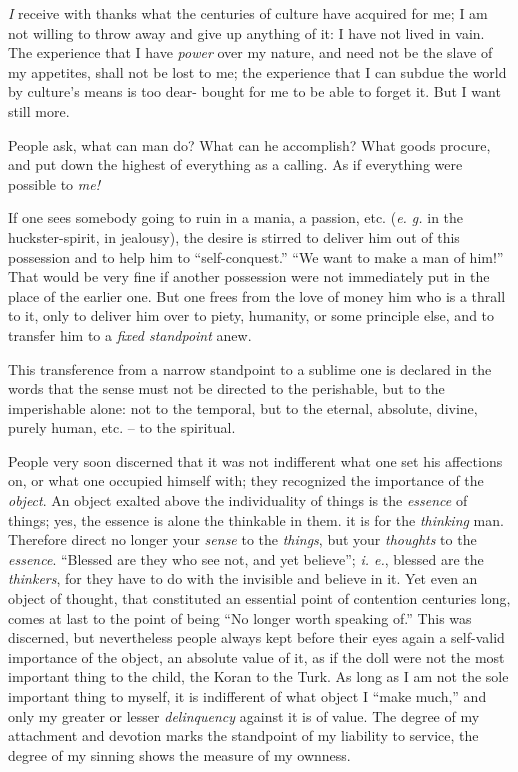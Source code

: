 \documentclass[12pt,a4paper]{book}
\begin{document}
\textit{I} receive with thanks what the centuries of culture have acquired for 
me; I am not willing to throw away and give up anything of it: I have not 
lived in vain. The experience that I have \textit{power} over my nature, and 
need not be the slave of my appetites, shall not be lost to me; the experience 
that I can subdue the world by culture's means is too dear- bought for me to 
be able to forget it. But I want still more.

People ask, what can man do? What can he accomplish? What goods procure, and 
put down the highest of everything as a calling. As if everything were 
possible to \textit{me!}

If one sees somebody going to ruin in a mania, a passion, etc. (\textit{e. g.} 
in the huckster-spirit, in jealousy), the desire is stirred to deliver him out 
of this possession and to help him to ``self-conquest.'' ``We want to make 
a man of him!'' That would be very fine if another possession were not 
immediately put in the place of the earlier one. But one frees from the love 
of money him who is a thrall to it, only to deliver him over to piety, 
humanity, or some principle else, and to transfer him to a \textit{fixed 
standpoint} anew.

This transference from a narrow standpoint to a sublime one is declared in the 
words that the sense must not be directed to the perishable, but to the 
imperishable alone: not to the temporal, but to the eternal, absolute, divine, 
purely human, etc. -- to the spiritual.

People very soon discerned that it was not indifferent what one set his 
affections on, or what one occupied himself with; they recognized the 
importance of the \textit{object}. An object exalted above the individuality 
of things is the \textit{essence} of things; yes, the essence is alone the 
thinkable in them. it is for the \textit{thinking} man. Therefore direct no 
longer your \textit{sense} to the \textit{things}, but your \textit{thoughts} 
to the \textit{essence}. ``Blessed are they who see not, and yet believe''; 
\textit{i. e.}, blessed are the \textit{thinkers}, for they have to do with 
the invisible and believe in it. Yet even an object of thought, that 
constituted an essential point of contention centuries long, comes at last to 
the point of being ``No longer worth speaking of.'' This was discerned, but 
nevertheless people always kept before their eyes again a self-valid 
importance of the object, an absolute value of it, as if the doll were not the 
most important thing to the child, the Koran to the Turk. As long as I am not 
the sole important thing to myself, it is indifferent of what object I ``make 
much,'' and only my greater or lesser \textit{delinquency} against it is of 
value. The degree of my attachment and devotion marks the standpoint of my 
liability to service, the degree of my sinning shows the measure of my 
ownness.
\end{document}
